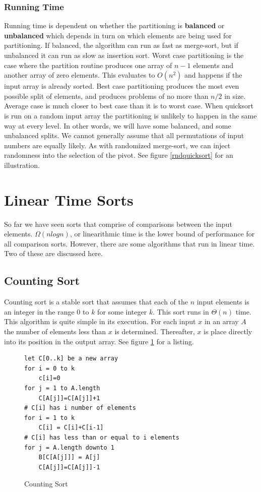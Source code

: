 \documentclass[10pt,a4paper]{article}
\begin{document}
\subsubsection{Running Time}
Running time is dependent on whether the partitioning is {\bf balanced} or {\bf unbalanced} which depends in turn on which elements are being used for partitioning. If balanced, the algorithm can run as fast as merge-sort, but if unbalanced it can run as slow as insertion sort. Worst case partitioning is the case where the partition routine produces one array of $n-1$ elements and another array of zero elements. This evaluates to $O(n^2)$ and happens if the input array is already sorted. Best case partitioning produces the most even possible split of elements, and produces problems of no more than $n/2$ in size. Average case is much closer to best case than it is to worst case. When quicksort is run on a random input array the partitioning is unlikely to happen in the same way at every level. In other words, we will have some balanced, and some unbalanced splits. We cannot generally assume that all permutations of input numbers are equally likely. 
\newline\newline
As with randomized merge-sort, we can inject randomness into the selection of the pivot. See figure \ref{rndquicksort} for an illustration. 

\section{Linear Time Sorts}
So far we have seen sorts that comprise of comparisons between the input elements. $\Omega(n log n)$, or linearithmic time is the lower bound of performance for all comparison sorts. However, there are some algorithms that run in linear time. Two of these are discussed here. 
\subsection{Counting Sort}
Counting sort is a stable sort that assumes that each of the $n$ input elements is an integer in the range $0$ to $k$ for some integer $k$. This sort runs in $\Theta(n)$ time. This algorithm is quite simple in its execution. For each input $x$ in an array $A$ the number of elements less than $x$ is determined. Thereafter, $x$ is place directly into its position in the output array. See figure \ref{counting} for a listing.   
\begin{figure}
\caption{Counting Sort \cite{INTROALG}}
\begin{center}
\begin{lstlisting}
let C[0..k] be a new array
for i = 0 to k 
	c[i]=0
for j = 1 to A.length 
	C[A[j]]=C[A[j]]+1
# C[i] has i number of elements
for i = 1 to k
	C[i] = C[i]+C[i-1]
# C[i] has less than or equal to i elements
for j = A.length downto 1
	B[C[A[j]]] = A[j]
	C[A[j]]=C[A[j]]-1
\end{lstlisting}
\label{counting}
\end{center}
\end{figure}
\end{document}
